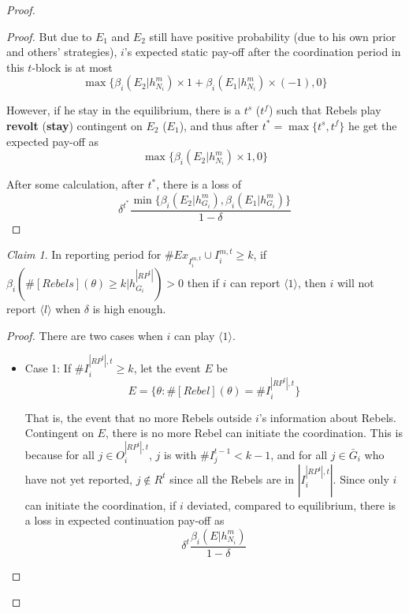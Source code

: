 \documentclass[12pt,letter]{article}
\theoremstyle{definition}
\theoremstyle{remark}
\theoremstyle{claim}
\newtheorem{claim}{Claim}
\begin{document}
\begin{proof}
\begin{proof}
But due to $E_1$ and $E_2$ still have positive probability (due to his own prior and others' strategies), $i$'s expected static pay-off after the coordination period in this $t$-block is at most 
\[
{\max\{\beta_{i}(E_2|h^{m}_{N_i})\times 1+\beta_{i}(E_1|h^{m}_{N_i})\times (-1), 0\}}
\]

However, if he stay in the equilibrium, there is a $t^s$ ($t^f$) such that Rebels play \textbf{revolt} (\textbf{stay}) contingent on $E_2$ ($E_1$), and thus after $t^*=\max\{t^s,t^f\}$ he get the expected pay-off as
\[
{\max\{\beta_{i}(E_2|h^{m}_{N_i})\times 1, 0\}}
\]

After some calculation, after $t^*$, there is a loss of
\[\delta^{t^{*}}\frac{\min\{\beta_{i}(E_2|h^{m}_{G_i}),\beta_{i}(E_1|h^{m}_{G_i})\}}{1-\delta}\]
 






\end{proof}







\begin{claim}
\label{claim_must_report_1}
In reporting period for $\# Ex_{I^{m,t}_i}\cup I^{m,t}_i \geq k$, if $\beta_{i}(\#[Rebels](\theta)\geq k|h^{|RP^t|}_{G_i})>0$ then if $i$ can report $\langle 1 \rangle$, then $i$ will not report $\langle l \rangle$ when $\delta$ is high enough.
\end{claim}

\begin{proof}

There are two cases when $i$ can play $\langle 1 \rangle$.
\begin{itemize}

\item Case 1: If $\#I^{|RP^t|,t}_i\geq k$, let the event $E$ be
\[E=\{\theta: \#[Rebel](\theta)=\# I^{|RP^t|,t}_i\}\]

That is, the event that no more Rebels outside $i$'s information about Rebels. Contingent on $E$, there is no more Rebel can initiate the coordination. This is because for all $j\in O^{|RP^t|,t}_i$, $j$ is with $\# I^{t-1}_j< k-1$, and for all $j\in \bar{G}_i$ who have not yet reported, $j\not\in R^t$ since all the Rebels are in $|I^{|RP^t|,t}_i|$. Since only $i$ can initiate the coordination, if $i$ deviated, compared to equilibrium, there is a loss in expected continuation pay-off as
\[\delta^{t}\frac{\beta_{i}(E|h^{m}_{N_i})}{1-\delta}\]


\end{itemize}
\end{proof}
\end{proof}
\end{document}
